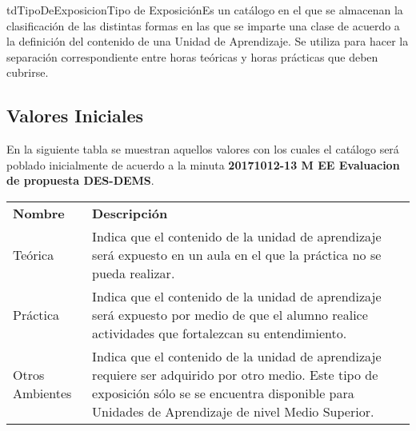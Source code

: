 \begin{TipoDeDato}{tdTipoDeExposicion}{Tipo de Exposición}{Es un catálogo en el que se almacenan la clasificación de las distintas formas en las que se imparte una clase de acuerdo a la definición del contenido de una Unidad de Aprendizaje. Se utiliza para hacer la separación correspondiente entre horas teóricas y horas prácticas que deben cubrirse.}
	
	\begin{tdAtributos}
	\end{tdAtributos}
	
	\subsection{Valores Iniciales}

	 En la siguiente tabla se muestran aquellos valores con los cuales el catálogo será poblado inicialmente de acuerdo a la minuta \textbf{20171012-13 M EE Evaluacion de propuesta DES-DEMS}.\cdtEmpty
		
		\begin{longtable}{| p{} | p{} |}
	 			\rowcolor{colorPrincipal}
	 			\multicolumn{2}{|c|}{\bf \color{white} Valores Iniciales}\\
	 			\hline
	 			\rowcolor{colorSecundario}
	 			\bf \color{white} Nombre & \bf \color{white}Descripción \\
	 			\hline
	 			Teórica & Indica que el contenido de la unidad de aprendizaje será expuesto en un aula en el que la práctica no se pueda realizar. \\
	 			\hline
	 			Práctica &  Indica que el contenido de la unidad de aprendizaje será expuesto por medio de que el alumno realice actividades que fortalezcan su entendimiento.\\
	 			\hline
	 			Otros Ambientes &  Indica que el contenido de la unidad de aprendizaje requiere ser adquirido por otro medio. Este tipo de exposición sólo se se encuentra disponible para Unidades de Aprendizaje de nivel Medio Superior. \\
	 			\hline
	 		\end{longtable}
	\end{TipoDeDato}
